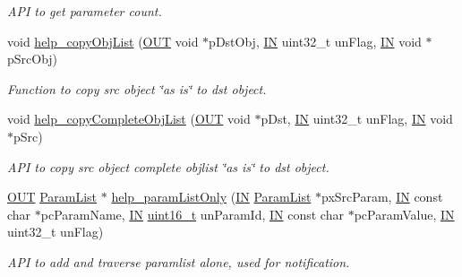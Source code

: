 \begin{DoxyCompactItemize}
\begin{DoxyCompactList}\small\item\em A\-P\-I to get parameter count. \end{DoxyCompactList}\item 
void \hyperlink{group__LIBHELP_gad717c26644b76d1891c4993611da13e4}{help\-\_\-copy\-Obj\-List} (\hyperlink{group__LIBHELP_gaec78e7a9e90a406a56f859ee456e8eae}{O\-U\-T} void $\ast$p\-Dst\-Obj, \hyperlink{group__LIBHELP_gac2bbd6d630a06a980d9a92ddb9a49928}{I\-N} uint32\-\_\-t un\-Flag, \hyperlink{group__LIBHELP_gac2bbd6d630a06a980d9a92ddb9a49928}{I\-N} void $\ast$p\-Src\-Obj)
\begin{DoxyCompactList}\small\item\em Function to copy src object \char`\"{}as is\char`\"{} to dst object. \end{DoxyCompactList}\item 
void \hyperlink{group__LIBHELP_ga83db2d4c1600b34e94db55083f5b1017}{help\-\_\-copy\-Complete\-Obj\-List} (\hyperlink{group__LIBHELP_gaec78e7a9e90a406a56f859ee456e8eae}{O\-U\-T} void $\ast$p\-Dst, \hyperlink{group__LIBHELP_gac2bbd6d630a06a980d9a92ddb9a49928}{I\-N} uint32\-\_\-t un\-Flag, \hyperlink{group__LIBHELP_gac2bbd6d630a06a980d9a92ddb9a49928}{I\-N} void $\ast$p\-Src)
\begin{DoxyCompactList}\small\item\em A\-P\-I to copy src object complete objlist \char`\"{}as is\char`\"{} to dst object. \end{DoxyCompactList}\item 
\hyperlink{group__LIBHELP_gaec78e7a9e90a406a56f859ee456e8eae}{O\-U\-T} \hyperlink{structParamList}{Param\-List} $\ast$ \hyperlink{group__LIBHELP_gaf0d77d8d7790407c0115675a2c562c39}{help\-\_\-param\-List\-Only} (\hyperlink{group__LIBHELP_gac2bbd6d630a06a980d9a92ddb9a49928}{I\-N} \hyperlink{structParamList}{Param\-List} $\ast$px\-Src\-Param, \hyperlink{group__LIBHELP_gac2bbd6d630a06a980d9a92ddb9a49928}{I\-N} const char $\ast$pc\-Param\-Name, \hyperlink{group__LIBHELP_gac2bbd6d630a06a980d9a92ddb9a49928}{I\-N} \hyperlink{commondefs_8h_adf4d876453337156dde61095e1f20223}{uint16\-\_\-t} un\-Param\-Id, \hyperlink{group__LIBHELP_gac2bbd6d630a06a980d9a92ddb9a49928}{I\-N} const char $\ast$pc\-Param\-Value, \hyperlink{group__LIBHELP_gac2bbd6d630a06a980d9a92ddb9a49928}{I\-N} uint32\-\_\-t un\-Flag)
\begin{DoxyCompactList}\small\item\em A\-P\-I to add and traverse paramlist alone, used for notification. \end{DoxyCompactList}\item 

\end{DoxyCompactItemize}
